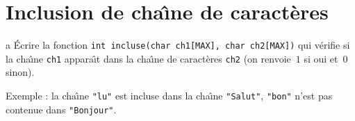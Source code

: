 \section{Inclusion de cha\^\i{}ne de caract\`eres}a
  \'Ecrire  la   fonction \texttt{int    incluse(char ch1[MAX],   char
    ch2[MAX])}    qui  v\'erifie   si   la   cha\^\i{}ne  \texttt{ch1}
  appara\^\i{}t dans  la cha\^\i{}ne de  caract\`eres \texttt{ch2} (on
  renvoie~$1$ si oui et~$0$ sinon).
  \par
  Exemple   : la   cha\^\i{}ne  \texttt{"lu"}  est   incluse  dans  la
  cha\^\i{}ne \texttt{"Salut"}, \texttt{"bon"} n'est pas contenue dans
  \texttt{"Bonjour"}.
